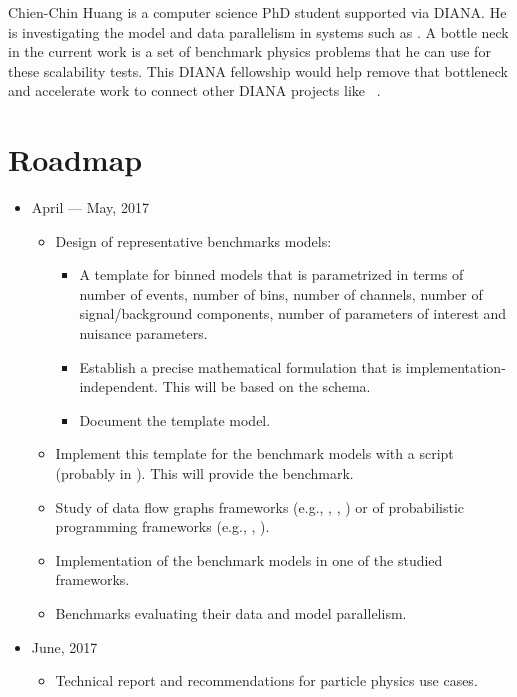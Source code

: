 Chien-Chin Huang is a computer science PhD student supported via DIANA.
He is investigating the model and data parallelism in systems such as .
A bottle neck in the current work is a set of benchmark physics problems that he can use for these scalability tests.
This DIANA fellowship would help remove that bottleneck and accelerate work to connect other DIANA projects like ~\cite{histogrammar2017}.

\section{Roadmap}
\begin{itemize}
	\item April --- May, 2017
	      \begin{itemize}
	      	\item Design of representative benchmarks models:
	      	      \begin{itemize}
	      	      	\item A template for binned models that is parametrized in terms of number of events, number of bins, number of channels, number of signal/background components, number of parameters of interest and nuisance parameters.
	      	      	\item Establish a precise mathematical formulation that is implementation-independent.
	      	      	      This will be based on the  schema.
	      	      	\item Document the template model.
	      	      \end{itemize}
	      	\item Implement this template for the benchmark models with a  script (probably in ).
	      	      This will provide the  benchmark.
	      	\item Study of data flow graphs frameworks (e.g., , , ) or of probabilistic programming frameworks (e.g., , ).
	      	\item Implementation of the benchmark models in one of the studied frameworks.
	      	\item Benchmarks evaluating their data and model parallelism.
	      \end{itemize}
	\item June, 2017
	      \begin{itemize}
	      	\item Technical report and recommendations for particle physics use cases.

\end{itemize}
\end{itemize}

